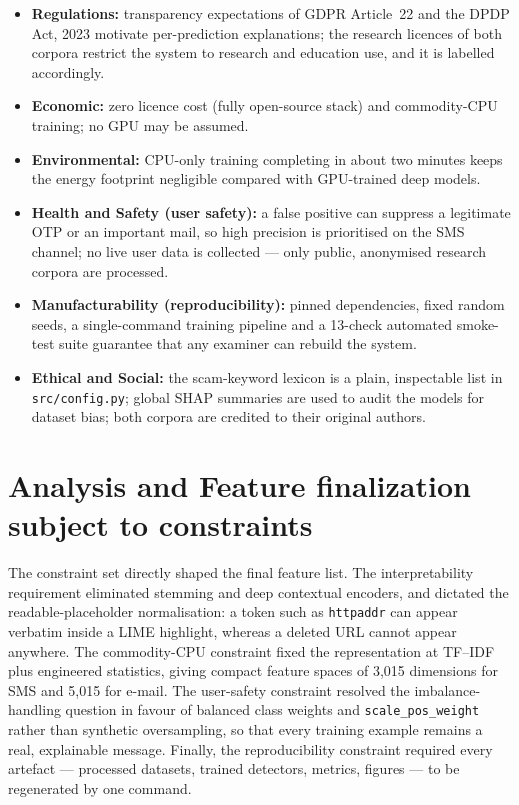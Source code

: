 \documentclass[12pt,a4paper]{report}
\begin{document}
\begin{itemize}
  \item \textbf{Regulations:} transparency expectations of GDPR Article~22
        and the DPDP Act, 2023 motivate per-prediction explanations; the
        research licences of both corpora restrict the system to research and
        education use, and it is labelled accordingly.
  \item \textbf{Economic:} zero licence cost (fully open-source stack) and
        commodity-CPU training; no GPU may be assumed.
  \item \textbf{Environmental:} CPU-only training completing in about two
        minutes keeps the energy footprint negligible compared with
        GPU-trained deep models.
  \item \textbf{Health and Safety (user safety):} a false positive can
        suppress a legitimate OTP or an important mail, so high precision is
        prioritised on the SMS channel; no live user data is collected ---
        only public, anonymised research corpora are processed.
  \item \textbf{Manufacturability (reproducibility):} pinned dependencies,
        fixed random seeds, a single-command training pipeline and a
        13-check automated smoke-test suite guarantee that any examiner can
        rebuild the system.
  \item \textbf{Ethical and Social:} the scam-keyword lexicon is a plain,
        inspectable list in \texttt{src/config.py}; global SHAP summaries are
        used to audit the models for dataset bias; both corpora are credited
        to their original authors.
\end{itemize}

\section{Analysis and Feature finalization subject to constraints}

The constraint set directly shaped the final feature list. The
interpretability requirement eliminated stemming and deep contextual
encoders, and dictated the readable-placeholder normalisation: a token such
as \texttt{httpaddr} can appear verbatim inside a LIME highlight, whereas a
deleted URL cannot appear anywhere. The commodity-CPU constraint fixed the
representation at TF--IDF plus engineered statistics, giving compact feature
spaces of 3{,}015 dimensions for SMS and 5{,}015 for e-mail. The user-safety
constraint resolved the imbalance-handling question in favour of balanced
class weights and \texttt{scale\_pos\_weight} rather than synthetic
oversampling, so that every training example remains a real, explainable
message. Finally, the reproducibility constraint required every artefact ---
processed datasets, trained detectors, metrics, figures --- to be regenerated
by one command.
\end{document}
